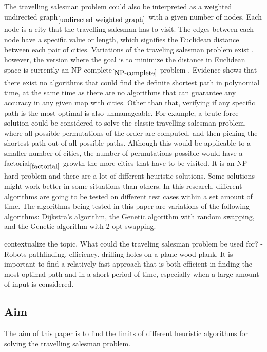 \documentclass{article}
\begin{document}
\noindent
The travelling salesman problem could also be interpreted as a weighted undirected graph$_{\ref{undirected weighted graph}}$ with a given number of nodes. Each node is a city that the travelling salesman has to visit. The edges between each node have a specific value or length, which signifies the Euclidean distance between each pair of cities. 
\newline
Variations of the traveling salesman problem exist \cite{gutin_punnen_2007}, however, the version where the goal is to minimize the distance in Euclidean space is currently an NP-complete$_{\ref{NP-complete}}$ problem \cite{PAPADIMITRIOU1977}. 
\newline
Evidence shows that there exist no algorithms that could find the definite shortest path in polynomial time, at the same time as there are no algorithms that can guarantee any accuracy in any given map with cities. Other than that, verifying if any specific path is the most optimal is also unmanageable. \cite{PAPADIMITRIOU1977}
\newline
For example, a brute force solution could be considered to solve the classic travelling salesman problem, where all possible permutations of the order are computed, and then picking the shortest path out of all possible paths. Although this would be applicable to a smaller number of cities, the number of permutations possible would have a factorial$_{\ref{factorial}}$ growth the more cities that have to be visited. 
\newline
It is an NP-hard problem and there are a lot of different heuristic solutions. Some solutions might work better in some situations than others. In this research, different algorithms are going to be tested on different test cases within a set amount of time. The algorithms being tested in this paper are variations of the following algorithms: Dijkstra's algorithm, the Genetic algorithm with random swapping, and the Genetic algorithm with 2-opt swapping.

contextualize the topic. What could the traveling salesman problem be used for? - Robots pathfinding, efficiency. drilling holes on a plane wood plank. 
It is important to find a relatively fast approach that is both efficient in finding the most optimal path and in a short period of time, especially when a large amount of input is considered. 


\subsection{Aim}\label{Aim}
The aim of this paper is to find the limits of different heuristic algorithms for solving the travelling salesman problem. 
\end{document}
